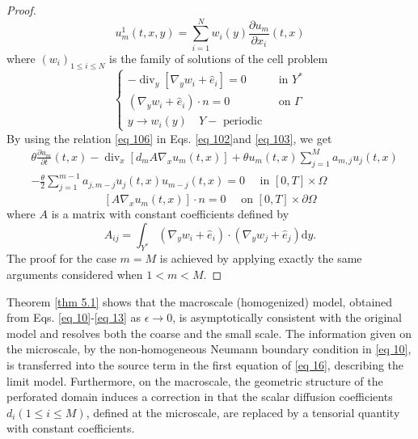 \begin{proof}
\begin{equation}
 u_{m}^{1}(t, x, y)=\sum_{i=1}^{N} w_{i}(y) \frac{\partial u_{m}}{\partial x_{i}}(t, x)
\label{eq 106}\end{equation}
where $\left(w_{i}\right)_{1 \leq i \leq N}$ is the family of solutions of the cell problem
\begin{equation}
 \left\{\begin{array}{lc}
-\operatorname{div}_{y}\left[\nabla_{y} w_{i}+\hat{e}_{i}\right]=0 & \text { in } Y^{*} \\
\left(\nabla_{y} w_{i}+\hat{e}_{i}\right) \cdot n=0 & \text { on } \Gamma \\
y \rightarrow w_{i}(y) \quad Y-\text { periodic } &
\end{array}\right.
\label{eq 107}\end{equation}
By using the relation \eqref{eq 106} in Eqs. \eqref{eq 102}and \eqref{eq 103}, we get
\begin{equation}
 \begin{aligned}
&\theta \frac{\partial u_{m}}{\partial t}(t, x)-\operatorname{div}_{x}\left[d_{m} A \nabla_{x} u_{m}(t, x)\right]+\theta u_{m}(t, x) \sum_{j=1}^{M} a_{m, j} u_{j}(t, x) \\
&-\frac{\theta}{2} \sum_{j=1}^{m-1} a_{j, m-j} u_{j}(t, x) u_{m-j}(t, x)=0 \quad \text { in }[0, T] \times \Omega \end{aligned}
\label{eq 108}\end{equation}
\begin{equation}
 \left[A \nabla_{x} u_{m}(t, x)\right] \cdot n=0 \quad \text { on }[0, T] \times \partial \Omega
\label{eq 109}\end{equation}
where $A$ is a matrix with constant coefficients defined by
$$
A_{i j}=\int_{Y^{*}}\left(\nabla_{y} w_{i}+\hat{e}_{i}\right) \cdot\left(\nabla_{y} w_{j}+\hat{e}_{j}\right) \mathrm{d} y .
$$
The proof for the case $m=M$ is achieved by applying exactly the same arguments considered when $1<m<M$.
\end{proof}
Theorem \eqref{thm 5.1} shows that the macroscale (homogenized) model, obtained from Eqs. \eqref{eq 10}-\eqref{eq 13} as $\epsilon \rightarrow 0$, is asymptotically consistent with the original model and resolves both the coarse and the small scale. The information given on the microscale, by the non-homogeneous Neumann boundary condition in \eqref{eq 10}, is transferred into the source term in the first equation of \eqref{eq 16}, describing the limit model. Furthermore, on the macroscale, the geometric structure of the perforated domain induces a correction in that the scalar diffusion coefficients $d_{i}(1 \leq i \leq M)$, defined at the microscale, are replaced by a tensorial quantity with constant coefficients.
